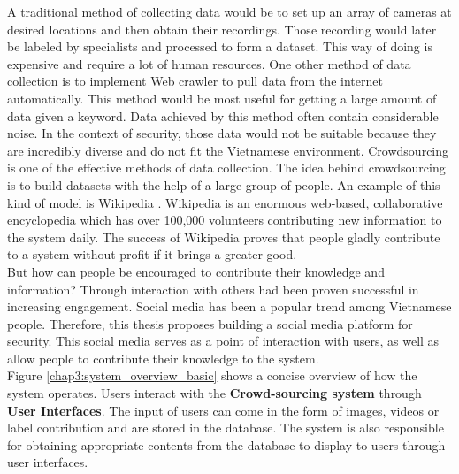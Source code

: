 
A traditional method of collecting data would be to set up an array of cameras at desired locations and then obtain their recordings. Those recording would later be labeled by specialists and processed to form a dataset. This way of doing is expensive and require a lot of human resources.
One other method of data collection is to implement Web crawler to pull data from the internet automatically. This method would be most useful for getting a large amount of data given a keyword. Data achieved by this method often contain considerable noise. In the context of security, those data would not be suitable because they are incredibly diverse and do not fit the Vietnamese environment.
Crowdsourcing is one of the effective methods of data collection. The idea behind crowdsourcing is to build datasets with the help of a large group of people. An example of this kind of model is Wikipedia 
. Wikipedia is an enormous web-based, collaborative encyclopedia which has over 100,000 volunteers contributing new information to the system daily. The success of Wikipedia proves that people gladly contribute to a system without profit if it brings a greater good. \\
But how can people be encouraged to contribute their knowledge and information? Through interaction with others had been proven successful in increasing engagement. Social media has been a popular trend among Vietnamese people. Therefore, this thesis proposes building a social media platform for security. This social media serves as a point of interaction with users, as well as allow people to contribute their knowledge to the system. \\
Figure \ref{chap3:system_overview_basic} shows a concise overview of how the system operates. Users interact with the \textbf{Crowd-sourcing system} through \textbf{User Interfaces}. The input of users can come in the form of images, videos or label contribution and are stored in the database. The system is also responsible for obtaining appropriate contents from the database to display to users through user interfaces.
